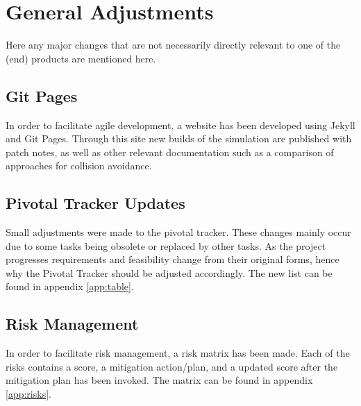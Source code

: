 \chapter{General Adjustments}
\label{ch:general}

Here any major changes that are not necessarily directly relevant to one of the (end) products are mentioned here.

\section{Git Pages}
In order to facilitate agile development, a website has been developed using Jekyll and Git Pages. Through this site new builds of the simulation are published with patch notes, as well as other relevant documentation such as a comparison of approaches for collision avoidance.
 
\section{Pivotal Tracker Updates}
Small adjustments were made to the pivotal tracker. These changes mainly occur due to some tasks being obsolete or replaced by other tasks. As the project progresses requirements and feasibility change from their original forms, hence why the Pivotal Tracker should be adjusted accordingly. The new list can be found in appendix \ref{app:table}.

\section{Risk Management}
In order to facilitate risk management, a risk matrix has been made. Each of the risks contains a score, a mitigation action/plan, and a updated score after the mitigation plan has been invoked. The matrix can be found in appendix \ref{app:risks}. %
